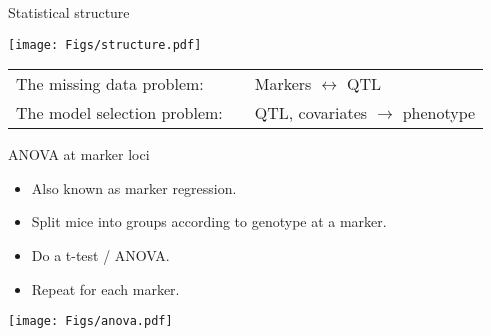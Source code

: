 \documentclass[12pt]{article}
\newcommand{\headsize}{\fontsize{35}{35} \selectfont}
\newcommand{\smallsize}{\fontsize{25}{30} \selectfont}
\newcommand{\smallersize}{\fontsize{20}{25} \selectfont}
\begin{document}
\newpage

\headsize \color{myyellow}
\hfill \begin{minipage}{5.75in}
\centering
Statistical structure
\end{minipage}

\vspace{2cm} \color{mywhite} \smallersize

\centerline{\texttt{[image: Figs/structure.pdf]}}

\vspace{15mm}

\hspace*{3cm}\begin{tabular}{lll}
{\color{mypink} The missing data problem:}  & \hspace{15mm} &
Markers $\longleftrightarrow$ QTL \\[15mm]

{\color{mypink} The model selection problem:}
& & QTL, covariates $\longrightarrow$ phenotype
\end{tabular}





\newpage

\headsize \color{myyellow}
\hfill\begin{minipage}{5.75in}
\centering
ANOVA at marker loci
\end{minipage}

\vspace{2cm}

\color{mywhite} \smallsize

\hspace*{0.5in}
\begin{minipage}[t]{4.1in}
\vspace*{5mm}

\sloppy
\smallersize
\begin{itemize}
\setlength{\rightskip}{0pt plus 1fil} %
\item Also known as {\color{mypink} marker regression}.
\item Split mice into groups according to genotype at a marker.
\item Do a t-test / ANOVA.
\item Repeat for each marker.
\end{itemize}
\end{minipage}
\hfill
\begin{minipage}[t]{5.3in}
\vspace*{0mm}

\texttt{[image: Figs/anova.pdf]}
\end{minipage}
\end{document}
